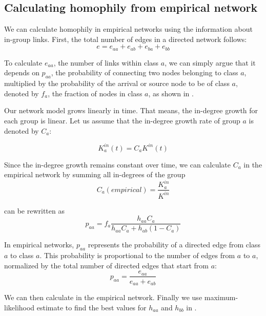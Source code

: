 \documentclass[fleqn,10pt]{wlscirep}
\begin{document}
\subsection{Calculating homophily from empirical network}
\label{sup:homophily}

We can calculate homophily in empirical networks using the information about in-group links. First, the total number of edges in a directed network follows:
\begin{equation}
  e = e_{aa} + e_{ab} +e_{ba}+ e_{bb}
\end{equation}

To calculate $e_{aa}$, the number of links within class $a$, we can simply argue that it depends on $p_{aa}$, the probability of connecting two nodes belonging to class $a$, multiplied by the probability of the arrival or source node to be of class $a$, denoted by $f_a$, the fraction of nodes in class $a$, as shown in .



Our network model grows linearly in time. That means, the in-degree growth for each group is linear. Let us assume that the in-degree growth rate of group $a$ is denoted by $C_a$:

\begin{equation}
 K^{in}_a(t) = C_a K^{in}(t)
\end{equation}

Since the in-degree growth remains constant over time, we can calculate $C_a$ in the empirical network by summing all in-degrees of the group
\begin{equation}
 C_a(empirical) = \frac{K^{in}_a}{K^{in}}
\end{equation}

 can be rewritten as
\begin{equation}\label{req:paa_analytical}
  p_{aa} = f_a\dfrac{h_{aa}C_a}{h_{aa}C_a + h_{ab}(1-C_a)}
\end{equation}


In empirical networks, $p_{aa}$ represents the probability of a directed edge from class $a$ to class $a$. This probability is proportional to the number of edges from $a$ to $a$, normalized by the total number of directed edges that start from $a$:
\begin{equation}\label{req:paa_empirical}
  p_{aa} = \frac{e_{aa}}{e_{aa}+e_{ab}}
\end{equation}

We can then calculate  in the empirical network. Finally we use maximum-likelihood estimate to find the best values for $h_{aa}$ and $h_{bb}$ in .
\end{document}

